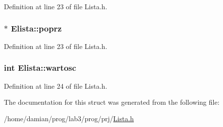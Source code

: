 Definition at line 23 of file Lista.\-h.

\hypertarget{struct_elista_aa4bfee465e1ea4484c9aeddc2437e532}{
\subsubsection[{poprz}]{ $\ast$ Elista\-::poprz}}\label{struct_elista_aa4bfee465e1ea4484c9aeddc2437e532}


Definition at line 23 of file Lista.\-h.

\hypertarget{struct_elista_a8de211523404f6484098bc85dd1ce52b}{
\subsubsection[{wartosc}]{\setlength{\rightskip}{0pt plus 5cm}int Elista\-::wartosc}}\label{struct_elista_a8de211523404f6484098bc85dd1ce52b}


Definition at line 24 of file Lista.\-h.



The documentation for this struct was generated from the following file\-:\begin{DoxyCompactItemize}
\item 
/home/damian/prog/lab3/prog/prj/\hyperlink{_lista_8h}{Lista.\-h}\end{DoxyCompactItemize}

